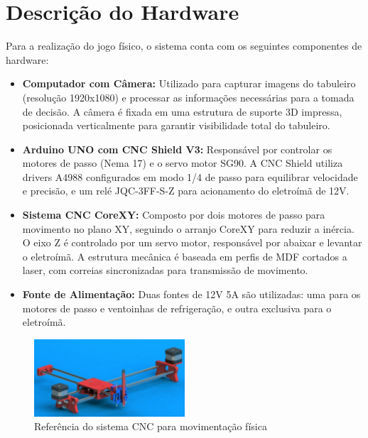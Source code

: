 \documentclass[a4paper,12pt]{article}
\begin{document}
\section{Descrição do Hardware}  
Para a realização do jogo físico, o sistema conta com os seguintes componentes de hardware:  
\begin{itemize}  
    \item \textbf{Computador com Câmera:} Utilizado para capturar imagens do tabuleiro (resolução 1920x1080) e processar as informações necessárias para a tomada de decisão. A câmera é fixada em uma estrutura de suporte 3D impressa, posicionada verticalmente para garantir visibilidade total do tabuleiro.  
    \item \textbf{Arduino UNO com CNC Shield V3:} Responsável por controlar os motores de passo (Nema 17) e o servo motor SG90. A CNC Shield utiliza drivers A4988 configurados em modo 1/4 de passo para equilibrar velocidade e precisão, e um relé JQC-3FF-S-Z para acionamento do eletroímã de 12V.  
    \item \textbf{Sistema CNC CoreXY:} Composto por dois motores de passo para movimento no plano XY, seguindo o arranjo CoreXY para reduzir a inércia. O eixo Z é controlado por um servo motor, responsável por abaixar e levantar o eletroímã. A estrutura mecânica é baseada em perfis de MDF cortados a laser, com correias sincronizadas para transmissão de movimento.  
    \item \textbf{Fonte de Alimentação:} Duas fontes de 12V 5A são utilizadas: uma para os motores de passo e ventoinhas de refrigeração, e outra exclusiva para o eletroímã.  
\end{itemize}  

\begin{figure}[H]  
    \centering  
    \includegraphics[width=0.5\textwidth]{images/drawingbot.png}   
    \caption{Referência do sistema CNC para movimentação física}  
    \label{fig:modelo_cnc}  
\end{figure}  

\end{document}

